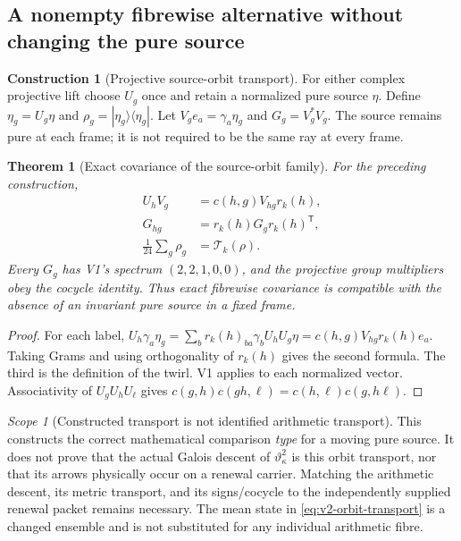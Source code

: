 \documentclass[11pt]{article}
\newtheorem{theorem}{Theorem}[section]
\theoremstyle{definition}
\newtheorem{construction}[construction]{Construction}
\theoremstyle{remark}
\newtheorem{scope}[scope]{Scope}
\newcommand{\ketbra}[1]{|#1\rangle\langle#1|}
\begin{document}
\subsection{A nonempty fibrewise alternative without changing the pure source}

\begin{construction}[Projective source-orbit transport]
\label{con:v2-orbit}
For either complex projective lift choose $U_g$ once and retain a normalized
pure source $\eta$. Define $\eta_g=U_g\eta$ and
$\rho_g=\ketbra{\eta_g}$. Let
$V_g e_a=\gamma_a\eta_g$ and $G_g=V_g^*V_g$.
The source remains pure at each frame; it is not required to be the same ray
at every frame.
\end{construction}

\begin{theorem}[Exact covariance of the source-orbit family]
\label{thm:v2-orbit}
For the preceding construction,
\begin{align}
 U_hV_g&=c(h,g)V_{hg}r_k(h),\\
 G_{hg}&=r_k(h)G_g r_k(h)^{\mathsf T},\\
 \frac1{24}\sum_g\rho_g&=\mathcal T_k(\rho).
 \label{eq:v2-orbit-transport}
\end{align}
Every $G_g$ has V1's spectrum $(2,2,1,0,0)$, and the projective group
multipliers obey the cocycle identity. Thus exact fibrewise covariance is
compatible with the absence of an invariant pure source in a fixed frame.
\end{theorem}
\begin{proof}
For each label,
$U_h\gamma_a\eta_g
=\sum_b r_k(h)_{ba}\gamma_b U_hU_g\eta
=c(h,g)V_{hg}r_k(h)e_a$.
Taking Grams and using orthogonality of $r_k(h)$ gives the second formula.
The third is the definition of the twirl. V1 applies to each normalized
vector. Associativity of $U_gU_hU_\ell$ gives
$c(g,h)c(gh,\ell)=c(h,\ell)c(g,h\ell)$.
\end{proof}

\begin{scope}[Constructed transport is not identified arithmetic transport]
This constructs the correct mathematical comparison \emph{type} for a
moving pure source. It does not prove that the actual Galois descent of
$\vartheta_\kappa^2$ is this orbit transport, nor that its arrows physically
occur on a renewal carrier. Matching the arithmetic descent, its metric
transport, and its signs/cocycle to the independently supplied renewal
packet remains necessary. The mean state in
\eqref{eq:v2-orbit-transport} is a changed ensemble and is not substituted
for any individual arithmetic fibre.
\end{scope}
\end{document}
